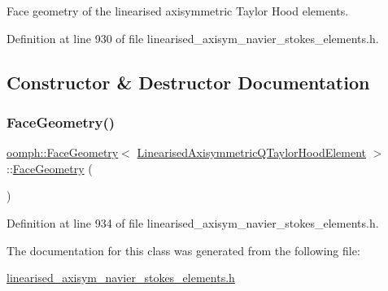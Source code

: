 Face geometry of the linearised axisymmetric Taylor Hood elements. 

Definition at line 930 of file linearised\+\_\+axisym\+\_\+navier\+\_\+stokes\+\_\+elements.\+h.



\subsection{Constructor \& Destructor Documentation}
\mbox{\label{classoomph_1_1FaceGeometry_3_01LinearisedAxisymmetricQTaylorHoodElement_01_4_aba4736892c14de22e160acfe9a722551}} 
\subsubsection{\texorpdfstring{Face\+Geometry()}{FaceGeometry()}}
{\footnotesize\ttfamily \hyperlink{classoomph_1_1FaceGeometry}{oomph\+::\+Face\+Geometry}$<$ \hyperlink{classoomph_1_1LinearisedAxisymmetricQTaylorHoodElement}{Linearised\+Axisymmetric\+Q\+Taylor\+Hood\+Element} $>$\+::\hyperlink{classoomph_1_1FaceGeometry}{Face\+Geometry} (\begin{DoxyParamCaption}{ }\end{DoxyParamCaption})\hspace{0.3cm}{\ttfamily [inline]}}



Definition at line 934 of file linearised\+\_\+axisym\+\_\+navier\+\_\+stokes\+\_\+elements.\+h.



The documentation for this class was generated from the following file\+:\begin{DoxyCompactItemize}
\item 
\hyperlink{linearised__axisym__navier__stokes__elements_8h}{linearised\+\_\+axisym\+\_\+navier\+\_\+stokes\+\_\+elements.\+h}\end{DoxyCompactItemize}
